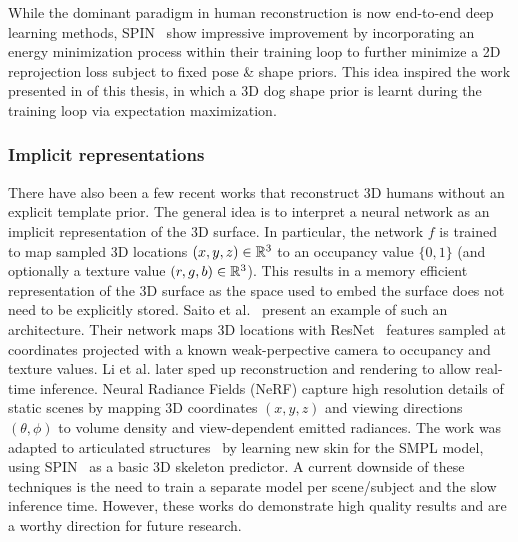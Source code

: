     While the dominant paradigm in human reconstruction is now end-to-end deep learning methods, SPIN~\cite{kolotouros19learning} show impressive improvement by incorporating an energy minimization process within their training loop to further minimize a 2D reprojection loss subject to fixed pose \& shape priors. This idea inspired the work presented in  of this thesis, in which a 3D dog shape prior is learnt during the training loop via expectation maximization.


    \subsubsection{Implicit representations}\label{ss:implicit}
    
    There have also been a few recent works that reconstruct 3D humans without an explicit template prior. The general idea is to interpret a neural network as an implicit representation of the 3D surface. In particular, the network $f$ is trained to map sampled 3D locations $(x,y,z) \in {\mathbb{R}^{3}}$ to an occupancy value $\{0,1\}$ (and optionally a texture value $(r,g,b) \in {\mathbb{R}^{3}}$). This results in a memory efficient representation of the 3D surface as the space used to embed the surface does not need to be explicitly stored. Saito et al.~\cite{pifuSHNMKL19,saito2020pifuhd} present an example of such an architecture. Their network maps 3D locations with ResNet~ features sampled at coordinates projected with a known weak-perpective camera to occupancy and texture values. Li et al. later sped up reconstruction and rendering to allow real-time inference. Neural Radiance Fields (NeRF) capture high resolution details of static scenes by mapping 3D coordinates $(x,y,z)$ and viewing directions $(\theta, \phi)$ to volume density and view-dependent emitted radiances. The work was adapted to articulated structures~ by learning new skin for the SMPL model, using SPIN~\cite{kolotouros19learning} as a basic 3D skeleton predictor. A current downside of these techniques is the need to train a separate model per scene/subject and the slow inference time. However, these works do demonstrate high quality results and are a worthy direction for future research.

